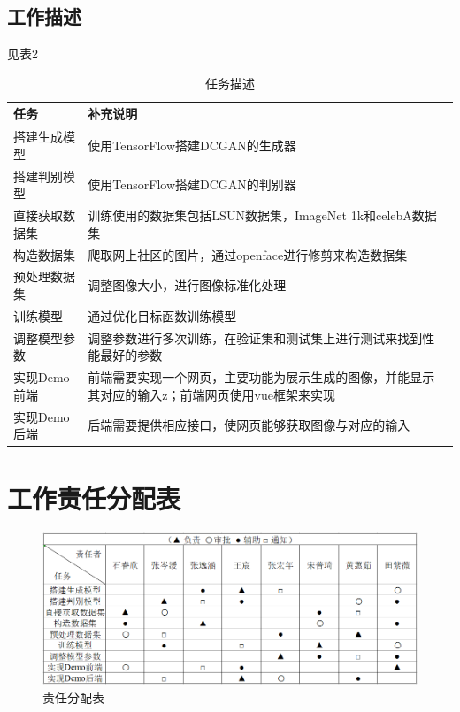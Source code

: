 \documentclass[
  hyperref, a4paper]{ctexart}
\begin{document}
\hypertarget{ux5de5ux4f5cux63cfux8ff0}{%
\subsection{工作描述}\label{ux5de5ux4f5cux63cfux8ff0}}

见表2

\begin{table}
    \caption{任务描述}
    \centering
    \begin{tabular}{|p{5.0cm}<{\centering}|p{7.5cm}<{\centering}|}
    \hline
    任务       & 补充说明                                                 \\ \hline
    搭建生成模型   & 使用TensorFlow搭建DCGAN的生成器                             \\ \hline
    搭建判别模型   & 使用TensorFlow搭建DCGAN的判别器                              \\ \hline
    直接获取数据集  & 训练使用的数据集包括LSUN数据集，ImageNet 1k和celebA数据集             \\ \hline
    构造数据集    & 爬取网上社区的图片，通过openface进行修剪来构造数据集                      \\ \hline
    预处理数据集   & 调整图像大小，进行图像标准化处理                                    \\ \hline
    训练模型     & 通过优化目标函数训练模型                                        \\ \hline
    调整模型参数   & 调整参数进行多次训练，在验证集和测试集上进行测试来找到性能最好的参数                  \\ \hline
    实现Demo前端 & 前端需要实现一个网页，主要功能为展示生成的图像，并能显示其对应的输入z；前端网页使用vue框架来实现   \\ \hline
    实现Demo后端 & 后端需要提供相应接口，使网页能够获取图像与对应的输入                          \\ \hline
    \end{tabular}
\end{table}

\hypertarget{ux5de5ux4f5cux8d23ux4efbux5206ux914dux8868}{%
\section{工作责任分配表}\label{ux5de5ux4f5cux8d23ux4efbux5206ux914dux8868}}

\begin{figure}
\centering
\includegraphics{1.png}
\caption{责任分配表}
\end{figure}
\end{document}
